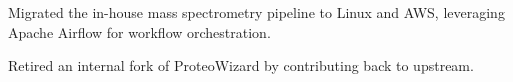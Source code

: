 \documentclass[]{resume}
\begin{document}
\begin{minipage}[t]{0.69\textwidth}


\begin{tightemize}
\item {Migrated the in-house mass spectrometry pipeline to Linux and AWS, leveraging Apache Airflow for workflow orchestration.}
\item {Retired an internal fork of ProteoWizard by contributing back to upstream.}
\end{tightemize}
\sectionsep




\end{minipage}
\end{document}
